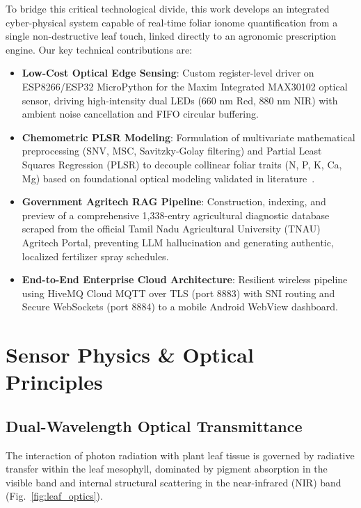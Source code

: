 \documentclass[9pt,twocolumn,a4paper,landscape]{article}
\begin{document}
To bridge this critical technological divide, this work develops an integrated cyber-physical system capable of real-time foliar ionome quantification from a single non-destructive leaf touch, linked directly to an agronomic prescription engine. Our key technical contributions are:
\begin{itemize}[leftmargin=*]
    \item \textbf{Low-Cost Optical Edge Sensing}: Custom register-level driver on ESP8266/ESP32 MicroPython for the Maxim Integrated MAX30102 optical sensor, driving high-intensity dual LEDs ($660\text{ nm}$ Red, $880\text{ nm}$ NIR) with ambient noise cancellation and FIFO circular buffering.
    \item \textbf{Chemometric PLSR Modeling}: Formulation of multivariate mathematical preprocessing (SNV, MSC, Savitzky-Golay filtering) and Partial Least Squares Regression (PLSR) to decouple collinear foliar traits (N, P, K, Ca, Mg) based on foundational optical modeling validated in literature~\cite{methodsx2024coffee, zhang2022spad}.
    \item \textbf{Government Agritech RAG Pipeline}: Construction, indexing, and preview of a comprehensive 1,338-entry agricultural diagnostic database scraped from the official Tamil Nadu Agricultural University (TNAU) Agritech Portal, preventing LLM hallucination and generating authentic, localized fertilizer spray schedules.
    \item \textbf{End-to-End Enterprise Cloud Architecture}: Resilient wireless pipeline using HiveMQ Cloud MQTT over TLS (port 8883) with SNI routing and Secure WebSockets (port 8884) to a mobile Android WebView dashboard.
\end{itemize}

\section{Sensor Physics \& Optical Principles}
\label{sec:physics}

\subsection{Dual-Wavelength Optical Transmittance}
The interaction of photon radiation with plant leaf tissue is governed by radiative transfer within the leaf mesophyll, dominated by pigment absorption in the visible band and internal structural scattering in the near-infrared (NIR) band (Fig.~\ref{fig:leaf_optics}).
\end{document}
